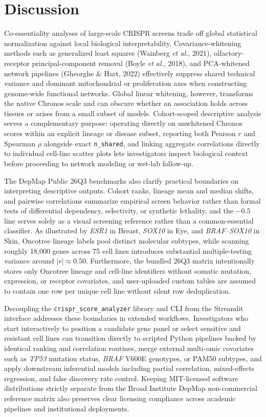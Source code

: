 \documentclass[11pt,a4paper]{article}
\begin{document}
\section{Discussion}
Co-essentiality analyses of large-scale CRISPR screens trade off global statistical normalization against local biological interpretability. Covariance-whitening methods such as generalized least squares (Wainberg \textit{et al.}, 2021), olfactory-receptor principal-component removal (Boyle \textit{et al.}, 2018), and PCA-whitened network pipelines (Gheorghe \& Hart, 2022) effectively suppress shared technical variance and dominant mitochondrial or proliferation axes when constructing genome-wide functional networks. Global linear whitening, however, transforms the native Chronos scale and can obscure whether an association holds across tissues or arises from a small subset of models. Cohort-scoped descriptive analysis serves a complementary purpose: operating directly on unwhitened Chronos scores within an explicit lineage or disease subset, reporting both Pearson $r$ and Spearman $\rho$ alongside exact \texttt{n\_shared}, and linking aggregate correlations directly to individual cell-line scatter plots lets investigators inspect biological context before proceeding to network modeling or wet-lab follow-up.

The DepMap Public 26Q3 benchmarks also clarify practical boundaries on interpreting descriptive outputs. Cohort ranks, lineage mean and median shifts, and pairwise correlations summarize empirical screen behavior rather than formal tests of differential dependency, selectivity, or synthetic lethality, and the $-0.5$ line serves solely as a visual screening reference rather than a common-essential classifier. As illustrated by \textit{ESR1} in Breast, \textit{SOX10} in Eye, and \textit{BRAF}--\textit{SOX10} in Skin, Oncotree lineage labels pool distinct molecular subtypes, while scanning roughly 18,000 genes across 75 cell lines introduces substantial multiple-testing variance around $|r| \approx 0.50$. Furthermore, the bundled 26Q3 matrix intentionally stores only Oncotree lineage and cell-line identifiers without somatic mutation, expression, or receptor covariates, and user-uploaded custom tables are assumed to contain one row per unique cell line without silent row deduplication.

Decoupling the \texttt{crispr\_score\_analyzer} library and CLI from the Streamlit interface addresses these boundaries in extended workflows. Investigators who start interactively to position a candidate gene panel or select sensitive and resistant cell lines can transition directly to scripted Python pipelines backed by identical ranking and correlation routines, merge external multi-omic covariates such as \textit{TP53} mutation status, \textit{BRAF} V600E genotypes, or PAM50 subtypes, and apply downstream inferential models including partial correlation, mixed-effects regression, and false discovery rate control. Keeping MIT-licensed software distributions strictly separate from the Broad Institute DepMap non-commercial reference matrix also preserves clear licensing compliance across academic pipelines and institutional deployments.
\end{document}
